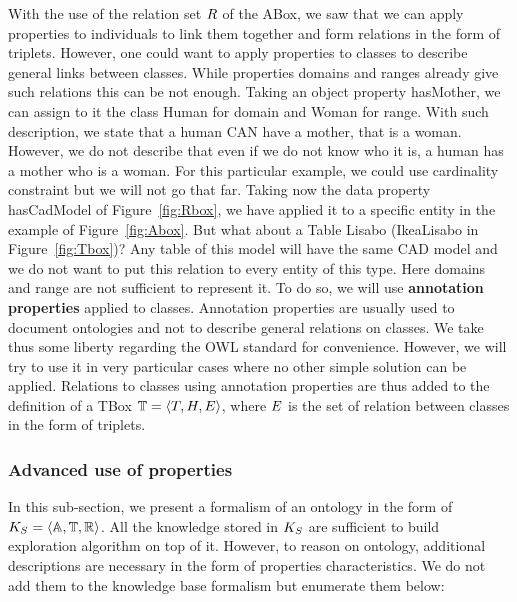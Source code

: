 With the use of the relation set $R$ of the ABox, we saw that we can apply properties to individuals to link them together and form relations in the form of triplets. However, one could want to apply properties to classes to describe general links between classes. While properties domains and ranges already give such relations this can be not enough. Taking an object property hasMother, we can assign to it the class Human for domain and Woman for range. With such description, we state that a human CAN have a mother, that is a woman. However, we do not describe that even if we do not know who it is, a human has a mother who is a woman. For this particular example, we could use cardinality constraint but we will not go that far. Taking now the data property hasCadModel of Figure~\ref{fig:Rbox}, we have applied it to a specific entity in the example of Figure~\ref{fig:Abox}. But what about a Table Lisabo (IkeaLisabo in Figure~\ref{fig:Tbox})? Any table of this model will have the same CAD model and we do not want to put this relation to every entity of this type. Here domains and range are not sufficient to represent it. To do so, we will use \textbf{annotation properties} applied to classes. Annotation properties are usually used to document ontologies and not to describe general relations on classes. We take thus some liberty regarding the OWL standard for convenience. However, we will try to use it in very particular cases where no other simple solution can be applied. Relations to classes using annotation properties are thus added to the definition of a TBox $\mathbb{T} = \langle T, H, E \rangle$, where $E$ is the set of relation between classes in the form of triplets.

\subsubsection{Advanced use of properties}

In this sub-section, we present a formalism of an ontology in the form of $K_S = \langle \mathbb{A}, \mathbb{T}, \mathbb{R} \rangle$. All the knowledge stored in $K_S$ are sufficient to build exploration algorithm on top of it. However, to reason on ontology, additional descriptions are necessary in the form of properties characteristics. We do not add them to the knowledge base formalism but enumerate them below: 

